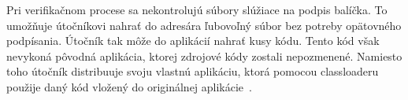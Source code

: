Pri verifikačnom procese sa nekontrolujú súbory slúžiace na podpis balíčka. To umožňuje útočníkovi nahrať do adresára  ľubovoľný súbor bez potreby opätovného podpísania. Útočník tak môže do aplikácií nahrať kusy kódu. Tento kód však nevykoná pôvodná aplikácia, ktorej zdrojové kódy zostali nepozmenené. Namiesto toho útočník distribuuje svoju vlastnú aplikáciu, ktorá pomocou classloaderu použije daný kód vložený do originálnej aplikácie~\cite{A7idcou1z6WqKvQZ}.
